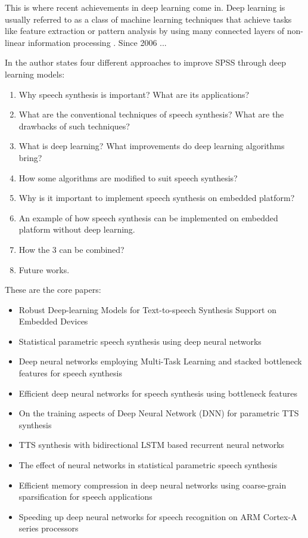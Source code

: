 This is where recent achievements in deep learning come in. Deep learning is usually referred to as a class of machine learning techniques that achieve tasks like feature extraction or pattern analysis by using many connected layers of non-linear information processing \cite{ling:deep, li:survey}. Since 2006 ...

In \cite{li:survey} the author states four different approaches to improve \ac{SPSS} through deep learning models: 

\newpage

\begin{enumerate}
	\item Why speech synthesis is important? What are its applications?
	\item What are the conventional techniques of speech synthesis? What are the drawbacks of such techniques?
	\item What is deep learning? What improvements do deep learning algorithms bring?
	\item How some algorithms are modified to suit speech synthesis?
	\item Why is it important to implement speech synthesis on embedded platform?
	\item An example of how speech synthesis can be implemented on embedded platform without deep learning.
	\item How the 3 can be combined?
	\item Future works.
\end{enumerate}


These are the core papers: 
\begin{itemize} %
	\item Robust Deep-learning Models for Text-to-speech Synthesis Support on Embedded Devices \cite{boros:robust}
	\item Statistical parametric speech synthesis using deep neural networks \cite{zen:deepstatistical}
	\item Deep neural networks employing Multi-Task Learning and stacked bottleneck features for speech synthesis \cite{wu:deep}
	\item Efficient deep neural networks for speech synthesis using bottleneck features \cite{joo:efficient}
	\item On the training aspects of Deep Neural Network (DNN) for parametric TTS synthesis \cite{qian:training}
	\item TTS synthesis with bidirectional LSTM based recurrent neural networks \cite{fan:tts}
	\item The effect of neural networks in statistical parametric speech synthesis \cite{hashimoto:effect}
	\item Efficient memory compression in deep neural networks using coarse-grain sparsification for speech applications \cite{kadetotad:efficient}
	\item Speeding up deep neural networks for speech recognition on ARM Cortex-A series processors \cite{xing:speeding}
\end{itemize}

